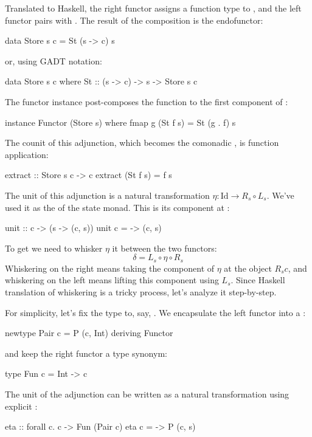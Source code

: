 \documentclass[DaoFP]{subfiles}
\begin{document}
Translated to Haskell, the right functor assigns a function type  to , and the left functor pairs  with . The result of the composition is the endofunctor:
\begin{haskell}
data Store s c = St (s -> c) s
\end{haskell}
or, using GADT notation:
\begin{haskell}
data Store s c where
    St :: (s -> c) -> s -> Store s c
\end{haskell}
The functor instance post-composes the function to the first component of  :
\begin{haskell}
instance Functor (Store s) where
  fmap g (St f s) = St (g . f) s
\end{haskell}

The counit of this adjunction, which becomes the comonadic , is function application:
\begin{haskell}
extract :: Store s c -> c
extract (St f s) = f s
\end{haskell}
The unit of this adjunction is a natural transformation $\eta \colon \text{Id} \to R_s \circ L_s$. We've used it as the  of the state monad. This is its component at :
\begin{haskell}
unit :: c -> (s -> (c, s))
unit c = \s -> (c, s)
\end{haskell}
To get  we need to whisker $\eta$ it between the two functors:
\[ \delta = L_s  \circ \eta \circ R_s \]
Whiskering on the right means taking the component of $\eta$ at the object $R_s c$, and whiskering on the left means lifting this component using $L_s$. Since Haskell translation of whiskering is a tricky process, let's analyze it step-by-step. 

For simplicity, let's fix the type  to, say, . We encapsulate the left functor into a :
\begin{haskell}
newtype Pair c = P (c, Int)
  deriving Functor
\end{haskell}
and keep the right functor a type synonym:
\begin{haskell}
type Fun c = Int -> c
\end{haskell}
The unit of the adjunction can be written as a natural transformation using explicit :
\begin{haskell}
eta :: forall c. c -> Fun (Pair c)
eta c = \s -> P (c, s)
\end{haskell}
\end{document}
